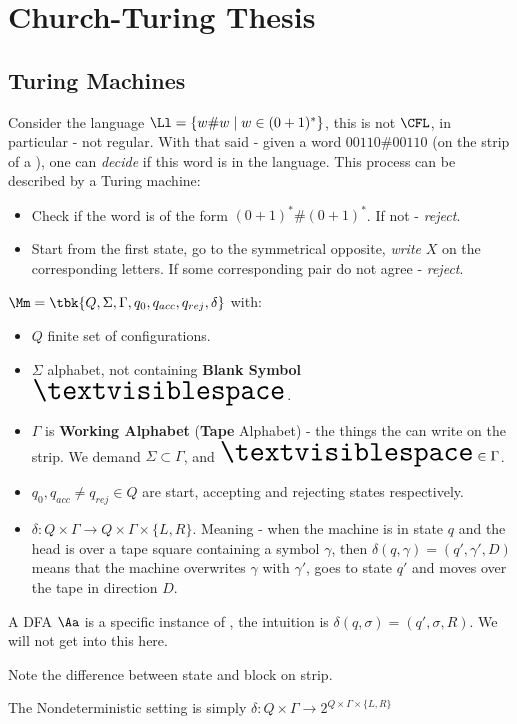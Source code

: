 \chapter{Church-Turing Thesis}
\section{Turing Machines}
\begin{example}
	Consider the language $\Ll = \{w\#w\mid w\in (0+1)^*\}$, this is not $\CFL$, in particular - not regular. With that said - given a word $00110\#00110$ (on the strip of a \TM), one can \textit{decide} if this word is in the language. This process can be described by a Turing machine:
	\begin{itemize}
		\item Check if the word is of the form $(0+1)^*\#(0+1)^*$. If not - \textit{reject}.
		\item Start from the first state, go to the symmetrical opposite, \textit{write} $X$ on the corresponding letters. If some corresponding pair do not agree - \textit{reject}.
	\end{itemize}
\end{example}
\begin{yellowBox}
	\begin{defn}
		 $\Mm = \tbk{Q,\Sigma, \Gamma, q_0, q_{acc}, q_{rej}, \delta}$ with:
		\begin{itemize}
			\item $Q$ finite set of configurations.
			\item $\Sigma$ alphabet, not containing \textbf{Blank Symbol} $\huge\textvisiblespace$.
			\item $\Gamma$ is \textbf{Working Alphabet} (\textbf{Tape} Alphabet) - the things the \TM can write on the strip. We demand $\Sigma\subset \Gamma$, and $\huge\textvisiblespace\in \Gamma$.
			\item $q_{0},q_{acc}\neq q_{rej}\in Q$ are start, accepting and rejecting states respectively.
			\item $\delta: Q\times \Gamma \to Q\times \Gamma \times \{L,R\}$. Meaning - when the machine is in state $q$ and the head is over a tape square containing a symbol $\gamma$, then $\delta(q,\gamma) = (q', \gamma', D)$ means that the machine overwrites $\gamma$ with $\gamma'$, goes to state $q'$ and moves over the tape in direction $D$.
		\end{itemize}
	\end{defn}
	\begin{remark}
		A DFA $\Aa$ is a specific instance of \TM, the intuition is $\delta(q,\sigma) = (q',\sigma, R)$. We will not get into this here.
	\end{remark}
	\begin{remark}
		Note the difference between state and block on strip.
	\end{remark}
	\begin{remark}
		The Nondeterministic setting is simply $\delta: Q\times \Gamma \to 2^{Q\times \Gamma \times \{L,R\}}$
	\end{remark}
\end{yellowBox}
